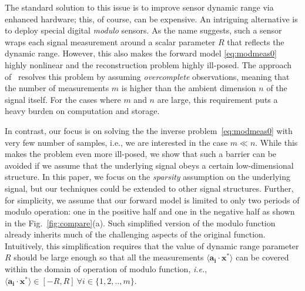 The standard solution to this issue is to improve sensor dynamic range via enhanced hardware; this, of course, can be expensive. An intriguing alternative is to deploy special digital \emph{modulo} sensors. As the name suggests, such a sensor wraps each signal measurement around a scalar parameter $R$ that reflects the dynamic range. However, this also makes the forward model \eqref{eq:modmeas0} highly nonlinear and the reconstruction problem highly ill-posed. The approach of~\cite{Bhandari,ICCP15_Zhao} resolves this problem by assuming \emph{overcomplete} observations, meaning that the number of measurements $m$ is higher than the ambient dimension $n$ of the signal itself. For the cases where $m$ and $n$ are large, this requirement puts a heavy burden on computation and storage. 

In contrast, our focus is on solving the the inverse problem~\eqref{eq:modmeas0} with very few number of samples, {i.e.}, we are interested in the case $m \ll n$. While this makes the problem even more ill-posed, we show that such a barrier can be avoided if we assume that the underlying signal obeys a certain low-dimensional structure. In this paper, we focus on the \emph{sparsity} assumption on the underlying signal, but our techniques could be extended to other signal structures. Further, for simplicity, we assume that our forward model is limited to only two periods of modulo operation: one in the positive half and one in the negative half as shown in the Fig.~\ref{fig:compare}(a). Such simplified version of the modulo function already inherits much of the challenging aspects of the original function. Intuitively, this simplification requires that the value of dynamic range parameter $R$ should be large enough so that all the measurements $\langle \mathbf{a_i} \cdot \mathbf{x^*} \rangle$ can be covered within the domain of operation of modulo function, \textit{i.e.}, $\langle \mathbf{a_i} \cdot \mathbf{x^*} \rangle \in [-R,R]~\forall i \in \{1,2,..,m\}$. 

